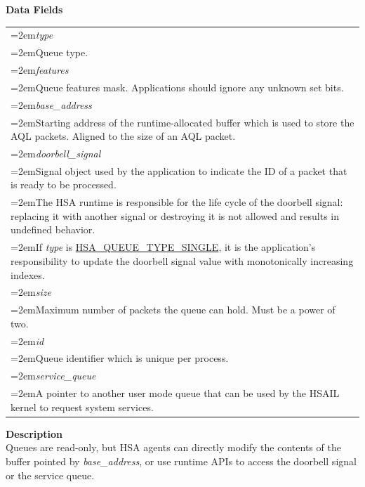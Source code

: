 \documentclass[final]{book}
\newcommand{\reffld}[1]{\textit{#1}}
\begin{document}
\noindent\textbf{Data Fields}\\[-6mm]
\begin{longtable}{@{}>{\hangindent=2em}p{\textwidth}}
\reffld{type}\\\hspace{2em}Queue type.\\[2mm]
\reffld{features}\\\hspace{2em}Queue features mask. Applications should ignore any unknown set bits.\\[2mm]
\reffld{base_\-address}\\\hspace{2em}Starting address of the runtime-allocated buffer which is used to store the AQL packets. Aligned to the size of an AQL packet.\\[2mm]
\reffld{doorbell_\-signal}\\\hspace{2em}Signal object used by the application to indicate the ID of a packet that is ready to be processed.\\[2mm]
\hspace{2em}The HSA runtime is responsible for the life cycle of the doorbell signal: replacing it with another signal or destroying it is not allowed and results in undefined behavior.\\[2mm]
\hspace{2em}If \textit{type} is \hyperlink{group__queue_1ggaf1939f228a41fa6ee50cffd4de03b561a45c3277e4e4fcb8a9788081549551f0a}{HSA_\-QUEUE_\-TYPE_\-SINGLE}, it is the application's responsibility to update the doorbell signal value with monotonically increasing indexes.\\[2mm]
\reffld{size}\\\hspace{2em}Maximum number of packets the queue can hold. Must be a power of two.\\[2mm]
\reffld{id}\\\hspace{2em}Queue identifier which is unique per process.\\[2mm]
\reffld{service_\-queue}\\\hspace{2em}A pointer to another user mode queue that can be used by the HSAIL kernel to request system services.
\end{longtable}

\vspace{-4mm}\noindent\textbf{Description}\\[1mm]
Queues are read-only, but HSA agents can directly modify the contents of the buffer pointed by \textit{base_\-address}, or use runtime APIs to access the doorbell signal or the service queue. 
\end{document}
